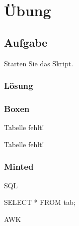 \section{Übung}
\label{sec:uebung_01}

\subsection{Aufgabe}
\label{sec:uebung_01.aufgabe_01}
Starten Sie das Skript.

\subsubsection*{Lösung}
\label{sec:uebung_01.aufgabe_01.loesung}

\subsubsection*{Boxen}
\begin{warn-popup}
  Tabelle fehlt!
\end{warn-popup}

\begin{info-popup}
  Tabelle fehlt!
\end{info-popup}

\subsubsection*{Minted}
SQL
\begin{sqlcode}
  SELECT *
  FROM tab;
\end{sqlcode}

AWK


